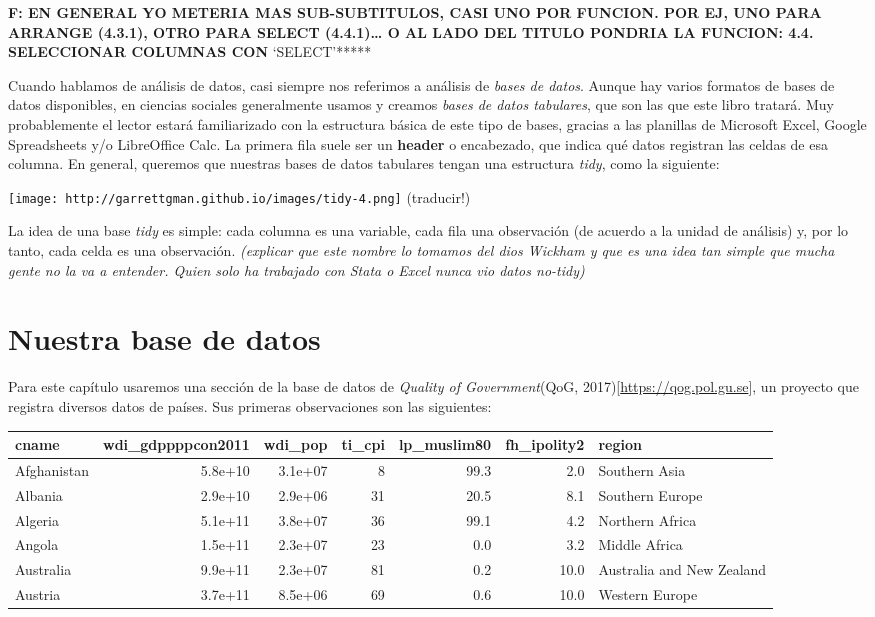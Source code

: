 \documentclass[]{book}
\begin{document}
\textbf{F: EN GENERAL YO METERIA MAS SUB-SUBTITULOS, CASI UNO POR
FUNCION. POR EJ, UNO PARA ARRANGE (4.3.1), OTRO PARA SELECT
(4.4.1)\ldots{} O AL LADO DEL TITULO PONDRIA LA FUNCION: 4.4.
SELECCIONAR COLUMNAS CON }`SELECT'*****

Cuando hablamos de análisis de datos, casi siempre nos referimos a
análisis de \emph{bases de datos}. Aunque hay varios formatos de bases
de datos disponibles, en ciencias sociales generalmente usamos y creamos
\emph{bases de datos tabulares}, que son las que este libro tratará. Muy
probablemente el lector estará familiarizado con la estructura básica de
este tipo de bases, gracias a las planillas de Microsoft Excel, Google
Spreadsheets y/o LibreOffice Calc. La primera fila suele ser un
\textbf{header} o encabezado, que indica qué datos registran las celdas
de esa columna. En general, queremos que nuestras bases de datos
tabulares tengan una estructura \emph{tidy}, como la siguiente:

\texttt{[image: http://garrettgman.github.io/images/tidy-4.png]}
(traducir!)

La idea de una base \emph{tidy} es simple: cada columna es una variable,
cada fila una observación (de acuerdo a la unidad de análisis) y, por lo
tanto, cada celda es una observación. \emph{(explicar que este nombre lo
tomamos del dios Wickham y que es una idea tan simple que mucha gente no
la va a entender. Quien solo ha trabajado con Stata o Excel nunca vio
datos no-tidy)}

\section{Nuestra base de datos}\label{nuestra-base-de-datos}

Para este capítulo usaremos una sección de la base de datos de
\emph{Quality of Government}(QoG,
2017){[}\url{https://qog.pol.gu.se}{]}, un proyecto que registra
diversos datos de países. Sus primeras observaciones son las siguientes:

\begin{tabular}{l|r|r|r|r|r|l}
\hline
cname & wdi\_gdppppcon2011 & wdi\_pop & ti\_cpi & lp\_muslim80 & fh\_ipolity2 & region\\
\hline
Afghanistan & 5.8e+10 & 3.1e+07 & 8 & 99.3 & 2.0 & Southern Asia\\
\hline
Albania & 2.9e+10 & 2.9e+06 & 31 & 20.5 & 8.1 & Southern Europe\\
\hline
Algeria & 5.1e+11 & 3.8e+07 & 36 & 99.1 & 4.2 & Northern Africa\\
\hline
Angola & 1.5e+11 & 2.3e+07 & 23 & 0.0 & 3.2 & Middle Africa\\
\hline
Australia & 9.9e+11 & 2.3e+07 & 81 & 0.2 & 10.0 & Australia and New Zealand\\
\hline
Austria & 3.7e+11 & 8.5e+06 & 69 & 0.6 & 10.0 & Western Europe\\
\hline
\end{tabular}
\end{document}
